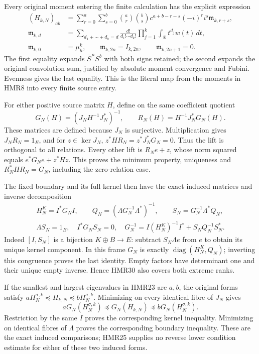 \documentclass[11pt,a4paper]{article}
\begin{document}
Every original moment entering the finite calculation
has the explicit expression
\[
 \begin{aligned}
 (H_{k,N})_{ab}
 &=\sum_{r=0}^a\sum_{s=0}^b
 \binom ar\binom bs c^{a+b-r-s}(-i)^r i^s
                       \mathfrak m_{k,r+s},\\
 \mathfrak m_{k,d}
 &=\sum_{d_1+\cdots+d_k=d}
       \frac{d!}{d_1!\cdots d_k!}
          \prod_{j=1}^k\int_{\mathbb R}t^{d_j}w(t)\,dt,\\
 \mathfrak m_{k,0}&=\mu_h^k,\qquad
 \mathfrak m_{k,2n}=I_{k,2n},\qquad
 \mathfrak m_{k,2n+1}=0 .
 \end{aligned}\tag{HMR28}
\]
The first equality expands $\overline S^{\,a}S^b$
with both signs retained; the second expands the
original convolution sum, justified by absolute
moment convergence and Fubini. Evenness gives the
last equality. This is the literal map from the
moments in HMR8 into every finite source entry.

For either positive source matrix $H$, define on
the same coefficient quotient
\[
 G_N(H)=(J_NH^{-1}J_N^*)^{-1},\qquad
 R_N(H)=H^{-1}J_N^*G_N(H).
 \tag{HMR29}
\]
These matrices are defined because $J_N$ is surjective.
Multiplication gives $J_NR_N=1_E$, and for
$z\in\ker J_N$,
$z^*HR_N=z^*J_N^*G_N=0$. Thus the lift is orthogonal
to all relations. Every other lift is $R_Ne+z$,
whose norm squared equals $e^*G_Ne+z^*Hz$.
This proves the minimum property, uniqueness and
$R_N^*HR_N=G_N$, including the zero-relation case.

The fixed boundary and its full kernel then have
the exact induced matrices and inverse decomposition
\[
 \begin{gathered}
 H_N^K=I^*G_NI,\qquad
 Q_N=(\Lambda G_N^{-1}\Lambda^*)^{-1},\qquad
 S_N=G_N^{-1}\Lambda^*Q_N,\\
 \Lambda S_N=1_B,\quad I^*G_NS_N=0,\quad
 G_N^{-1}=I(H_N^K)^{-1}I^*+S_NQ_N^{-1}S_N^* .
 \end{gathered}\tag{HMR30}
\]
Indeed $[I,S_N]$ is a bijection $K\oplus B\to E$:
subtract $S_N\Lambda e$ from $e$ to obtain its
unique kernel component. In this frame $G_N$
is exactly $\operatorname{diag}(H_N^K,Q_N)$;
inverting this congruence proves the last identity.
Empty factors have determinant one and their unique
empty inverse. Hence HMR30 also covers both extreme ranks.

If the smallest and largest eigenvalues in HMR23
are $a,b$, the original forms satisfy
$aH_N^{\sigma,k}\preceq H_{k,N}\preceq bH_N^{\sigma,k}$.
Minimizing on every identical fibre of $J_N$ gives
\[
 aG_N(H_N^{\sigma,k})\preceq G_N(H_{k,N})
                  \preceq bG_N(H_N^{\sigma,k}).
 \tag{HMR31}
\]
Restriction by the same $I$ proves the corresponding
kernel inequality. Minimizing on identical fibres
of $\Lambda$ proves the corresponding boundary
inequality. These are the exact induced comparisons;
HMR25 supplies no reverse lower condition estimate
for either of these two induced forms.
\end{document}
